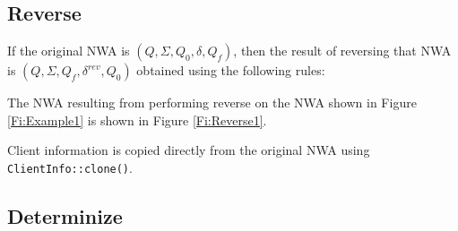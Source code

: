 
\subsection{Reverse}
\label{Se:Reverse}



If the original NWA is $(Q, \Sigma, Q_0, \delta, Q_f)$, then the result of
reversing that NWA is $(Q, \Sigma, Q_f, \delta^{rev}, Q_0)$ obtained using
the following rules:



The NWA resulting from performing reverse on the NWA shown in
Figure \ref{Fi:Example1} is shown in Figure \ref{Fi:Reverse1}.
 

Client
information is copied directly from the original NWA using
\texttt{ClientInfo::clone()}.

\subsection{Determinize}
\label{Se:Determinize}

